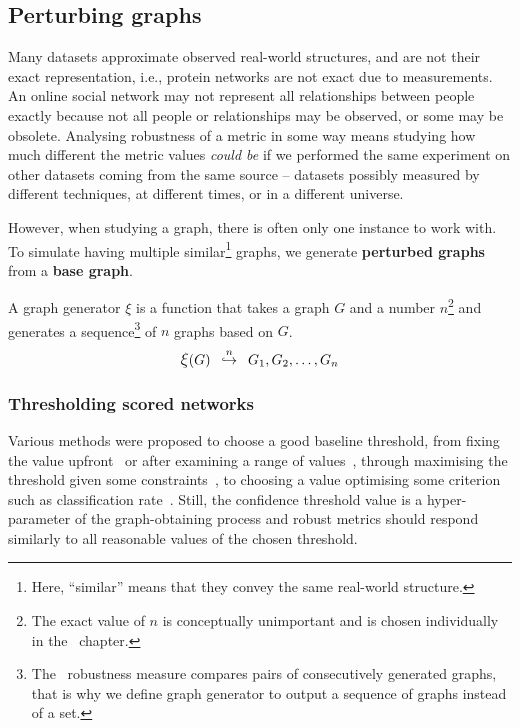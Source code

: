 

\subsection{Perturbing graphs}\label{sec:perturbing_graphs}

Many datasets approximate observed real-world structures, and are not their exact representation, i.e., protein networks are not exact due to measurements.
An online social network may not represent all relationships between people exactly because not all people or relationships may be observed, or some may be obsolete.
Analysing robustness of a metric in some way means studying how much different the metric values \textsl{could be} if we performed the same experiment on other datasets coming from the same source -- datasets possibly measured by different techniques, at different times, or in a different universe.

However, when studying a graph, there is often only one instance to work with.
To simulate having multiple similar\footnote{Here, ``similar'' means that they convey the same real-world structure.} graphs, we generate \textbf{perturbed graphs} from a \textbf{base graph}.

\begin{savenotes}
    \begin{definition}
        \vspace*{-2mm}
        A graph generator $\xi$ is a function that takes a graph $G$ and a number $n$\footnote{The exact value of $n$ is conceptually unimportant and is chosen individually in the~ chapter.} and generates a sequence\footnote{The~ robustness measure compares pairs of consecutively generated graphs, that is why we define graph generator to output a sequence of graphs instead of a set.} of $n$ graphs based on $G$.
        \begin{equation}
            \mathlarger{\xi}(G) \generates{n} G_1, G_2, \dots, G_n
        \end{equation}
    \end{definition}
\end{savenotes}

\subsubsection*{Thresholding scored networks}

Various methods were proposed to choose a good baseline threshold, from fixing the value upfront~\cite{MeunierAgerelatedChangesModular2009} or after examining a range of values~\cite{vanWijkComparingBrainNetworks2010,HorstmannStateDependentProperties2010}, through maximising the threshold given some constraints~\cite{BassettAdaptiveReconfigurationFractal2006}, to choosing a value optimising some criterion such as classification rate~\cite{ZaninOptimizingFunctionalNetwork2012}.
Still, the confidence threshold value is a hyper-parameter of the graph-obtaining process and robust metrics should respond similarly to all reasonable values of the chosen threshold.

